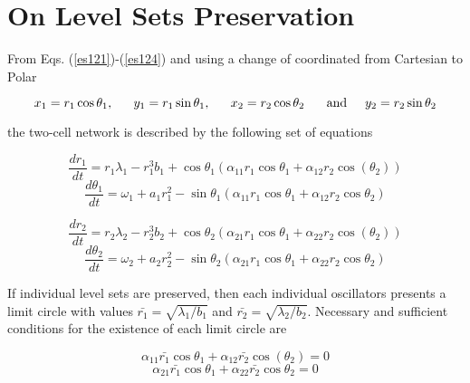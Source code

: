 %
\chapter{On Level Sets Preservation}
\label{sec:appendix}

From Eqs. (\ref{es121})-(\ref{es124}) and using a change of coordinated from Cartesian to Polar

\begin{equation}
    x_{1}=r_{1}\cos{\theta_{1}}\text{, } \hspace{0.5cm} y_{1}=r_{1}\sin{\theta_{1}} \text{, } \hspace{0.5cm} x_{2}=r_{2}\cos{\theta_{2}} \hspace{0.5cm} \text{ and} \hspace{0.5cm} y_{2}=r_{2}\sin{\theta_{2}}
\end{equation}

the two-cell network is described by the following set of equations

\begin{equation}
    \frac{dr_{1}}{dt} = r_{1}\lambda_{1} - r_{1}^{3}b_{1} + \cos{\theta_{1}}\left(\alpha_{11}r_{1}\cos{\theta_{1}} + \alpha_{12}r_{2}\cos(\theta_{2})\right)
\end{equation}
\begin{equation}
  \frac{d\theta_{1}}{dt} = \omega_{1}+a_{1}r_{1}^{2} -\sin{\theta_{1}}\left( \alpha_{11}r_{1}\cos{\theta_{1}} + \alpha_{12}r_{2}\cos{\theta_{2}} \right)
\end{equation}

\begin{equation}
    \frac{dr_{2}}{dt} = r_{2}\lambda_{2} - r_{2}^{3}b_{2} + \cos{\theta_{2}}\left(\alpha_{21}r_{1}\cos{\theta_{1}} + \alpha_{22}r_{2}\cos(\theta_{2})\right)
\end{equation}
\begin{equation}
  \frac{d\theta_{2}}{dt} = \omega_{2}+a_{2}r_{2}^{2} -\sin{\theta_{2}}\left( \alpha_{21}r_{1}\cos{\theta_{1}} + \alpha_{22}r_{2}\cos{\theta_{2}} \right)
\end{equation}

If individual level sets are preserved, then each individual oscillators presents a limit circle with values $\bar{r_{1}} = \sqrt{\lambda_{1}/b_{1}}$ and $\bar{r_{2}} = \sqrt{\lambda_{2}/b_{2}}$. Necessary and sufficient conditions for the existence of each limit circle are

\begin{equation}
    \alpha_{11}\bar{r_{1}}\cos{\theta_{1}} + \alpha_{12}\bar{r_{2}}\cos(\theta_{2}) = 0
    \label{A1}
\end{equation}
\begin{equation}
    \alpha_{21}\bar{r_{1}}\cos{\theta_{1}} + \alpha_{22}\bar{r_{2}}\cos{\theta_{2}} = 0
    \label{A2}
\end{equation}

